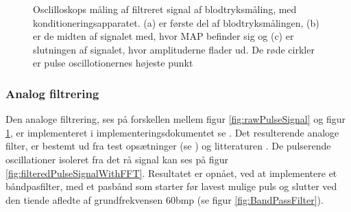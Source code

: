 \begin{figure}[H]
	\centering
	\caption{Osclilloskops måling af filtreret signal af blodtryksmåling, med konditioneringsapparatet. (a) er første del af blodtryksmålingen, (b) er de midten af signalet med, hvor MAP befinder sig og (c) er slutningen af signalet, hvor amplituderne flader ud. De røde cirkler er pulse oscillotionernes højeste punkt}\label{fig:filteredPulseSignal}
\end{figure}

\subsubsection{Analog filtrering}
Den analoge filtrering, ses på forskellen mellem figur \ref{fig:rawPulseSignal} og figur \ref{fig:filteredPulseSignal}, er implementeret i implementeringsdokumentet se . 
Det resulterende analoge filter, er bestemt ud fra test opsætninger (se ) og litteraturen . De pulserende oscillationer isoleret fra det rå signal kan ses på figur \ref{fig:filteredPulseSignalWithFFT}. Resultatet er opnået, ved at implementere et båndpasfilter, med et pasbånd som starter før lavest mulige puls og slutter ved den tiende afledte af grundfrekvensen 60bmp (se figur \ref*{fig:BandPassFilter}).

